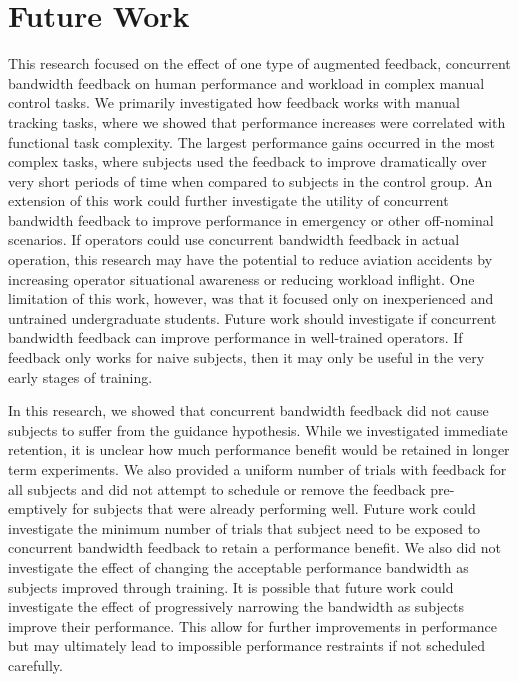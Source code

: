 \section{Future Work}

This research focused on the effect of one type of augmented feedback, concurrent bandwidth feedback on human performance and workload in complex manual control tasks.
We primarily investigated how feedback works with manual tracking tasks, where we showed that performance increases were correlated with functional task complexity.
The largest performance gains occurred in the most complex tasks, where subjects used the feedback to improve dramatically over very short periods of time when compared to subjects in the control group.
An extension of this work could further investigate the utility of concurrent bandwidth feedback to improve performance in emergency or other off-nominal scenarios.
If operators could use concurrent bandwidth feedback in actual operation, this research may have the potential to reduce aviation accidents by increasing operator situational awareness or reducing workload inflight.
One limitation of this work, however, was that it focused only on inexperienced and untrained undergraduate students.
Future work should investigate if concurrent bandwidth feedback can improve performance in well-trained operators.
If feedback only works for naive subjects, then it may only be useful in the very early stages of training.

In this research, we showed that concurrent bandwidth feedback did not cause subjects to suffer from the guidance hypothesis.
While we investigated immediate retention, it is unclear how much performance benefit would be retained in longer term experiments.
We also provided a uniform number of trials with feedback for all subjects and did not attempt to schedule or remove the feedback pre-emptively for subjects that were already performing well.
Future work could investigate the minimum number of trials that subject need to be exposed to concurrent bandwidth feedback to retain a performance benefit.
We also did not investigate the effect of changing the acceptable performance bandwidth as subjects improved through training.
It is possible that future work could investigate the effect of progressively narrowing the bandwidth as subjects improve their performance.
This allow for further improvements in performance but may ultimately lead to impossible performance restraints if not scheduled carefully.

